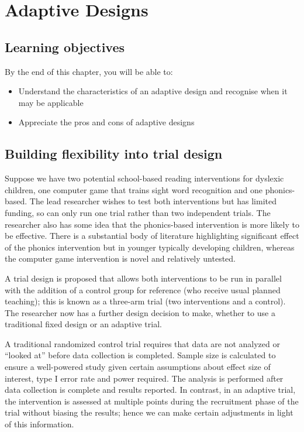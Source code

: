 \documentclass{krantz}
\providecommand{\tightlist}{%
\setlength{\itemsep}{0pt}\setlength{\parskip}{0pt}}
\begin{document}
\hypertarget{adaptive}{%
\chapter{Adaptive Designs}\label{adaptive}}

\hypertarget{learning-objectives-15}{%
\section{Learning objectives}\label{learning-objectives-15}}

By the end of this chapter, you will be able to:

\begin{itemize}
\tightlist
\item
  Understand the characteristics of an adaptive design and recognise when it may be applicable
\item
  Appreciate the pros and cons of adaptive designs
\end{itemize}

\hypertarget{building-flexibility-into-trial-design}{%
\section{Building flexibility into trial design}\label{building-flexibility-into-trial-design}}

Suppose we have two potential school-based reading interventions for dyslexic children, one computer game that trains sight word recognition and one phonics-based. The lead researcher wishes to test both interventions but has limited funding, so can only run one trial rather than two independent trials. The researcher also has some idea that the phonics-based intervention is more likely to be effective. There is a substantial body of literature highlighting significant effect of the phonics intervention but in younger typically developing children, whereas the computer game intervention is novel and relatively untested.

A trial design is proposed that allows both interventions to be run in parallel with the addition of a control group for reference (who receive usual planned teaching); this is known as a three-arm trial (two interventions and a control). The researcher now has a further design decision to make, whether to use a traditional fixed design or an adaptive trial.

A traditional randomized control trial requires that data are not analyzed or ``looked at'' before data collection is completed. Sample size is calculated to ensure a well-powered study given certain assumptions about effect size of interest, type I error rate and power required. The analysis is performed after data collection is complete and results reported. In contrast, in an adaptive trial, the intervention is assessed at multiple points during the recruitment phase of the trial without biasing the results; hence we can make certain adjustments in light of this information.
\end{document}
